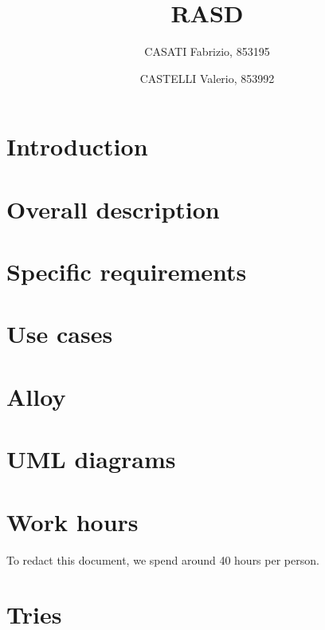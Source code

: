 




\title{RASD}
\author{
	CASATI Fabrizio, 853195
	\and
	CASTELLI Valerio, 853992
}

\maketitle
\tableofcontents

\chapter{Introduction}


\chapter{Overall description}


\chapter{Specific requirements}


\begin{appendices}
\chapter{Use cases}


\chapter{Alloy}


\chapter{UML diagrams}


\chapter{Work hours}
To redact this document, we spend around 40 hours per person.

\chapter{Tries}
%    
%
%

\end{appendices}


